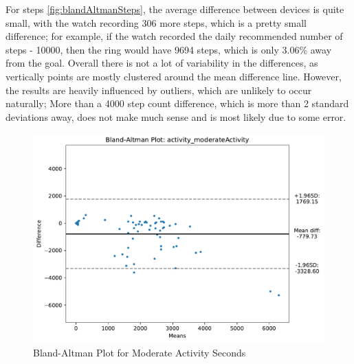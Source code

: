 For steps \ref{fig:blandAltmanSteps}, the average difference between devices is quite small, with the watch recording 306 more steps, which is a pretty small difference; for example, if the watch recorded the daily recommended number of steps - 10000, then the ring would have 9694 steps, which is only 3.06\% away from the goal. Overall there is not a lot of variability in the differences, as vertically points are mostly clustered around the mean difference line. However, the results are heavily influenced by outliers, which are unlikely to occur naturally; More than a 4000 step count difference, which is more than 2 standard deviations away, does not make much sense and is most likely due to some error. 
\begin{figure}
    
    \centering
    \includegraphics[width=\textwidth,keepaspectratio]{../images/bland_altman_moderateActivity.pdf}
    \caption{Bland-Altman Plot for Moderate Activity Seconds}
    \label{fig:blandAltmanSoftActivity}
    
\end{figure}

